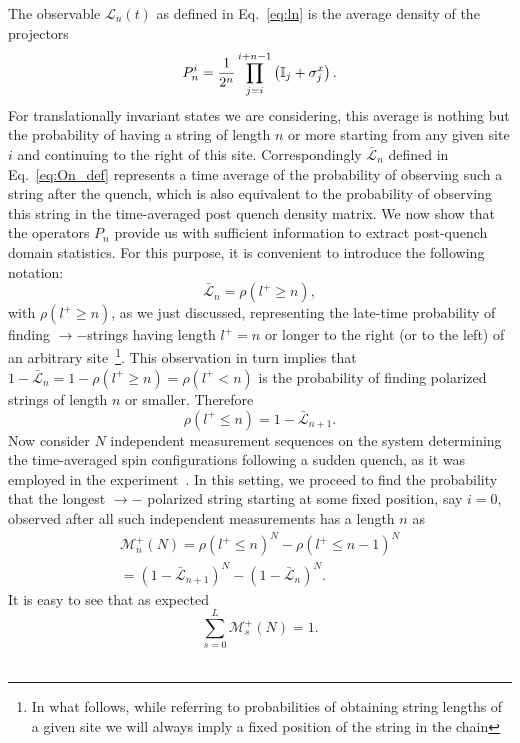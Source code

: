 \documentclass[aps,prx,twocolumn]{revtex4-2}
\begin{document}
 {The observable  $\mathcal L_n(t)$ as defined in Eq.~\eqref{eq:ln} is the average density of the projectors 
\[
P_n^i={1\over 2^n}\prod_{j=i}^{i+n-1} \left(\mathbb{I}_j+\sigma_j^x\right).
\]
For translationally invariant states we are considering, this average is nothing but the probability of having a string of length $n$ or more starting from any given site $i$ and continuing to the right of this site.  Correspondingly
$\bar {\mathcal L}_n$ defined in Eq.~\eqref{eq:On_def} represents a time average of the probability of observing such a string after the quench,  which is also equivalent to the probability of observing this string in the time-averaged post quench density matrix.  We now show that the operators $P_n$ provide  {us with} sufficient information to extract post-quench domain statistics. For this purpose, it is convenient to introduce the following notation:
\begin{equation}
\bar{\mathcal{L}}_n=\rho(l^+\geq n),
\end{equation}
with $\rho(l^+\geq  n)$,  as we just discussed,  representing the late-time probability of finding $\rightarrow-$strings having length $l^+=n$  {or longer to the right (or to the left) of an arbitrary site~\footnote{In what follows, while referring to probabilities of obtaining string lengths of a given site we will always imply a fixed position of the string in the chain}}.   This observation in turn implies that  {$1-\bar{\mathcal{L}}_n=1-\rho(l^+\geq  n)=\rho(l^+<n)$} is {the probability of finding polarized strings of  length $n$ or smaller}.  Therefore
\begin{equation}\label{eq:prob}
\rho(l^+\leq n)=1-\bar{\mathcal{L}}_{n+1}.
\end{equation}
Now consider $N$ independent measurement sequences on the system determining the time-averaged spin configurations following a sudden quench, as it was employed in the experiment~\cite{Zhang2017}.  In this setting, we proceed to find the probability that the longest $\rightarrow-$ polarized string starting at some fixed position, say $i=0$,  observed after all such independent measurements has a length $n$ as
\begin{multline}\label{eq:Mprob}
\mathcal{M}_n^+(N) =\rho(l^+\leq n)^N-\rho(l^+\leq n-1)^N\\=
 \left(1-\bar{\mathcal{L}}_{n+1}\right)^N- \left(1-\bar{\mathcal{L}}_n\right)^N.
\end{multline} 
It is easy to see that as expected
\begin{equation}\label{eq:norm_u}
\sum\limits_{s=0}^{L}\mathcal{M}_s^+(N)=1.
\end{equation}
}\\
\end{document}
